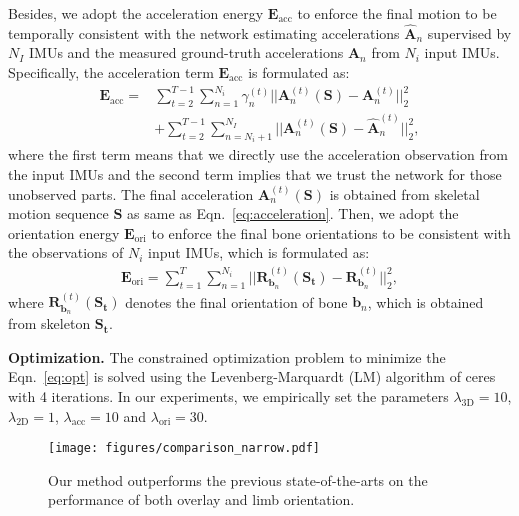\documentclass[letterpaper]{article} \usepackage{aaai23}  \usepackage{times}  \usepackage{helvet}  \usepackage{courier}  \usepackage[hyphens]{url}  \usepackage{graphicx} \urlstyle{rm} \def\UrlFont{\rm}  \usepackage{natbib}  \usepackage{caption} \frenchspacing  \setlength{\pdfpagewidth}{8.5in}  \setlength{\pdfpageheight}{11in}  \usepackage{algorithm}
\newcommand{\myparagraph}[1]{\vspace{0.1em}\noindent\textbf{#1}}
\begin{document}
Besides, we adopt the acceleration energy $\boldsymbol{E}_{\mathrm{acc}}$ to enforce the final motion to be temporally consistent with the network estimating accelerations $\mathbf{\hat{A}}_n$ supervised by $N_I$ IMUs and the measured ground-truth accelerations $\mathbf{A}_n$ from $N_i$ input IMUs.
Specifically, the acceleration term $\boldsymbol{E}_{\mathrm{acc}}$ is formulated as:
\begin{align}
\label{Eqn.acceleration term}
\boldsymbol{E}_{\mathrm{acc}} =  &\sum_{t=2}^{T-1} \sum_{n=1}^{N_i} \gamma_{n}^{(t)}||\mathbf{A}_n^{(t)}(\mathbf{S})  - \mathbf{A}_n^{(t)}||_2^2 \nonumber\\
&+\sum_{t=2}^{T-1} \sum_{n=N_i+1}^{N_I}||\mathbf{A}_n^{(t)}(\mathbf{S})  - \mathbf{\hat{A}}_n^{(t)}||_2^2,
\end{align}
where the first term means that we directly use the acceleration observation from the input IMUs and the second term implies that we trust the network for those unobserved parts. 
The final acceleration $\mathbf{A}_n^{(t)}(\mathbf{S})$ is obtained from skeletal motion sequence $\mathbf{S}$ as same as Eqn.~\ref{eq:acceleration}.
Then, we adopt the orientation energy $\boldsymbol{E}_{\mathrm{ori}}$ to enforce the final bone orientations to be consistent with the observations of $N_i$ input IMUs, which is formulated as: 
\begin{align} \label{eq:opt_ori}
	\boldsymbol{E}_{\mathrm{ori}} = \sum_{t=1}^T \sum_{n=1}^{N_i} ||\mathbf{R}_{\textbf{b}_n}^{(t)}(\mathbf{\mathbf{S_t}})  - \mathbf{R}_{\textbf{b}_n}^{(t)}||_2^2,
\end{align}
where $\mathbf{R}_{\textbf{b}_n}^{(t)}(\mathbf{\mathbf{S_t}})$ denotes the final orientation of bone $\textbf{b}_n$, which is obtained from skeleton $\mathbf{S_t}$.


\myparagraph{Optimization.}
The constrained optimization problem to minimize the Eqn.~\ref{eq:opt} is solved using the Levenberg-Marquardt (LM) algorithm of ceres~\cite{ceresSolver} 
with 4 iterations. In our experiments, we empirically set the parameters $\lambda_{\mathrm{3D}}=10$, $\lambda_{\mathrm{2D}}=1$, $\lambda_{\mathrm{acc}}=10$ and $\lambda_{\mathrm{ori}}=30$.







 \begin{figure}[b]
	\centering
	\texttt{[image: figures/comparison\_narrow.pdf]}
	\caption{Our method outperforms the previous state-of-the-arts on the performance of both overlay and limb orientation.}
	\label{fig:Comparison}
\end{figure}
\end{document}
